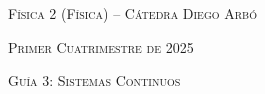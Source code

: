 \documentclass[11pt,spanish]{article}
\begin{document}
    \begin{center}
    \textsc{\large Física 2 (Física) -- Cátedra Diego Arbó}
    \par\end{center}{\large \par}
    
    \begin{center}
    \textsc{\large Primer Cuatrimestre de 2025}
    \par\end{center}{\large \par}
    
    \begin{center}
    \textsc{\large Guía 3: Sistemas Continuos}
    \par\end{center}{\large \par}
\end{document}
